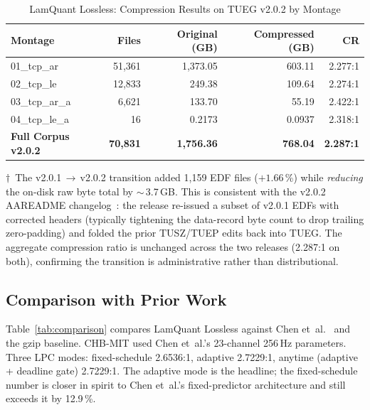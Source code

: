 \documentclass[journal]{IEEEtran}
\begin{document}
\begin{table}[!t]
\renewcommand{\arraystretch}{1.3}
\caption{LamQuant Lossless: Compression Results on TUEG v2.0.2
by Montage}
\label{tab:results}
\centering
\begin{tabular}{lrrrr}
\toprule
Montage & Files & Original (GB) & Compressed (GB) & CR \\
\midrule
01\_tcp\_ar      & 51{,}361 & 1{,}373.05 & 603.11 & 2.277:1 \\
02\_tcp\_le      & 12{,}833 &   249.38   & 109.64 & 2.274:1 \\
03\_tcp\_ar\_a   &  6{,}621 &   133.70   &  55.19 & 2.422:1 \\
04\_tcp\_le\_a   &      16 &     0.2173 &   0.0937 & 2.318:1 \\
\midrule
\textbf{Full Corpus v2.0.2} & \textbf{70{,}831} & \textbf{1{,}756.36} & \textbf{768.04} & \textbf{2.287:1} \\
\bottomrule
\end{tabular}

\vspace{0.4em}
\noindent\parbox{0.95\textwidth}{\scriptsize $\dagger$~The
v2.0.1\,$\rightarrow$\,v2.0.2 transition added 1{,}159 EDF files
($+1.66$\,\%) while \emph{reducing} the on-disk raw byte total by
$\sim$\,3.7\,GB. This is consistent with the v2.0.2 AAREADME
changelog~\cite{tueg_aareadme_v202}: the release re-issued a
subset of v2.0.1 EDFs with corrected headers (typically tightening
the data-record byte count to drop trailing zero-padding) and
folded the prior TUSZ/TUEP edits back into TUEG. The aggregate
compression ratio is unchanged across the two releases (2.287:1
on both), confirming the transition is administrative rather than
distributional.}
\end{table}

\subsection{Comparison with Prior Work}
Table~\ref{tab:comparison} compares LamQuant Lossless against
Chen et~al.~\cite{chen2018vlsi} and the gzip baseline. CHB-MIT
used Chen et~al.'s 23-channel 256\,Hz parameters. Three LPC
modes: fixed-schedule 2.6536:1, adaptive 2.7229:1, anytime
(adaptive + deadline gate) 2.7229:1. The adaptive mode is the
headline; the fixed-schedule number is closer in spirit to Chen
et~al.'s fixed-predictor architecture and still exceeds it by
12.9\,\%.
\end{document}
